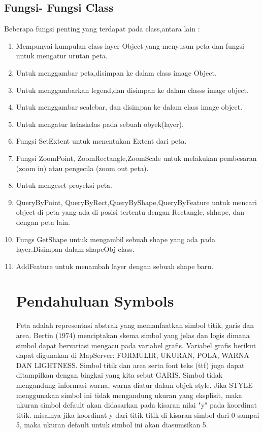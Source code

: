 \subsection {Fungsi- Fungsi Class}
Beberapa fungsi penting yang terdapat pada class,antara lain :
\begin{enumerate}
\item Mempunyai kumpulan class layer Object yang menyusun peta dan fungsi untuk mengatur urutan peta.
\item Untuk menggambar peta,disimpan ke dalam class image Object.
\item Untuk menggambarkan legend,dan disimpan ke dalam classs image object.
\item Untuk menggambar scalebar, dan disimpan ke dalam class image object.
\item Untuk mengatur kelaskelas pada sebuah obyek(layer).
\item Fungsi SetExtent untuk menentukan Extent dari peta.
\item Fungsi ZoomPoint, ZoomRectangle,ZoomScale untuk melakukan pembesaran (zoom in) atau pengecila (zoom out peta).
\item Untuk mengeset proyeksi peta.
\item QueryByPoint, QueryByRect,QueryByShape,QueryByFeature untuk mencari object di peta yang ada di posisi tertentu dengan Rectangle, shhape, dan dengan peta lain.
\item Fungs GetShape untuk mengambil sebuah shape yang ada pada layer.Disimpan dalam shapeObj class.
\item AddFeature untuk menambah layer dengan sebuah shape baru.


\section {Pendahuluan Symbols}
    Peta adalah representasi abstrak yang memanfaatkan simbol titik, garis dan area. Bertin (1974) menciptakan skema simbol yang jelas dan logis dimana simbol dapat bervariasi mengacu pada variabel grafis. Variabel grafis berikut dapat digunakan di MapServer: FORMULIR, UKURAN, POLA, WARNA DAN LIGHTNESS. Simbol titik dan area serta font teks (ttf) juga dapat ditampilkan dengan bingkai yang kita sebut GARIS. Simbol tidak mengandung informasi warna, warna diatur dalam objek style. Jika STYLE menggunakan simbol ini tidak mengandung ukuran yang eksplisit, maka ukuran simbol default akan didasarkan pada kisaran nilai "y" pada koordinat titik. misalnya jika koordinat y dari titik-titik di kisaran simbol dari 0 sampai 5, maka ukuran default untuk simbol ini akan diasumsikan 5.
    

\end{enumerate}
